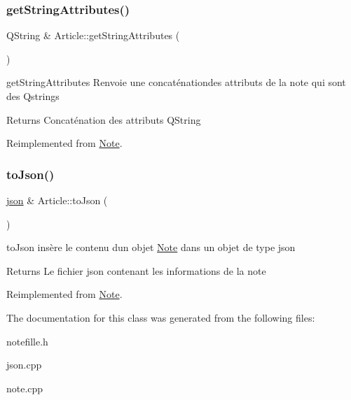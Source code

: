 \subsubsection{\texorpdfstring{get\+String\+Attributes()}{getStringAttributes()}}
{\footnotesize\ttfamily Q\+String \& Article\+::get\+String\+Attributes (\begin{DoxyParamCaption}{ }\end{DoxyParamCaption})\hspace{0.3cm}{\ttfamily [virtual]}}



get\+String\+Attributes Renvoie une concaténationdes attributs de la note qui sont des Qstrings 

\begin{DoxyReturn}{Returns}
Concaténation des attributs Q\+String 
\end{DoxyReturn}


Reimplemented from \hyperlink{classNote_a0ffff907bdb41b8c6a4abe62dfa3a2c1}{Note}.

\mbox{\label{classArticle_af1ca7d2c39aae800610504319526f3e3}} 
\subsubsection{\texorpdfstring{to\+Json()}{toJson()}}
{\footnotesize\ttfamily \hyperlink{classnlohmann_1_1basic__json}{json} \& Article\+::to\+Json (\begin{DoxyParamCaption}{ }\end{DoxyParamCaption})\hspace{0.3cm}{\ttfamily [virtual]}}



to\+Json insère le contenu d\textquotesingle{}un objet \hyperlink{classNote}{Note} dans un objet de type json 

\begin{DoxyReturn}{Returns}
Le fichier json contenant les informations de la note 
\end{DoxyReturn}


Reimplemented from \hyperlink{classNote_ac5bd9736feb45b144795d7ef1fc6a1ae}{Note}.



The documentation for this class was generated from the following files\+:\begin{DoxyCompactItemize}
\item 
notefille.\+h\item 
json.\+cpp\item 
note.\+cpp\end{DoxyCompactItemize}
